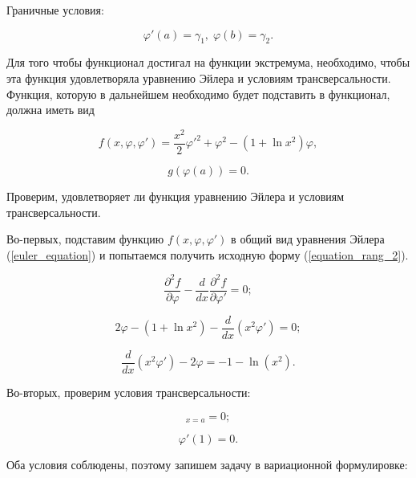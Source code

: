 \documentclass{article}
\begin{document}
\noindent Граничные условия:

\begin{displaymath}
	\varphi'(a) = \gamma_{1}, \; \varphi(b) = \gamma_{2}.
\end{displaymath}

Для того чтобы функционал достигал на функции экстремума, необходимо, чтобы эта функция удовлетворяла уравнению Эйлера и условиям трансверсальности. Функция, которую в дальнейшем необходимо будет подставить в функционал, должна иметь вид

\begin{displaymath}
	f(x, \varphi, \varphi') = \frac{x^2}{2}\varphi'^2 + \varphi^2 - (1+\ln{x^2})\varphi,
\end{displaymath}

\begin{displaymath}
	g(\varphi(a)) = 0.
\end{displaymath}

\noindent Проверим, удовлетворяет ли функция уравнению Эйлера и условиям трансверсальности. 

Во-первых, подставим функцию $f(x, \varphi, \varphi')$ в общий вид уравнения Эйлера (\ref{euler_equation}) и попытаемся получить исходную форму (\ref{equation_rang_2}).

\begin{displaymath}
	\frac{\partial^2 f}{\partial \varphi} - \frac{d}{dx}\frac{\partial^2 f}{\partial \varphi'} = 0;
\end{displaymath}

\begin{displaymath}
	2\varphi - (1 + \ln{x^2}) - \frac{d}{dx}(x^2 \varphi') = 0;
\end{displaymath}

\begin{displaymath}
	\frac{d}{dx}(x^2 \varphi') - 2\varphi = -1 - \ln(x^2).
\end{displaymath}

\noindent Во-вторых, проверим условия трансверсальности:

\begin{displaymath}
	[\frac{\partial^2 f}{\partial \varphi'} - \frac{\partial g}{d\varphi(a)}]_{x=a} = 0;
\end{displaymath}

\begin{displaymath}
	\varphi'(1) = 0.
\end{displaymath}

\noindent Оба условия соблюдены, поэтому запишем задачу в вариационной формулировке:
\end{document}

